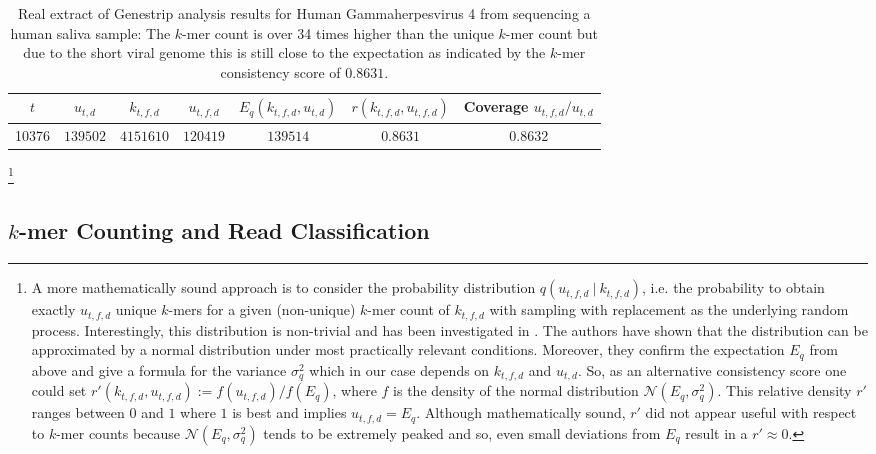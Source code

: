 \documentclass[letterpaper,11pt,leqno]{article}
\begin{document}
\begin{table}[h]
\centering
\begin{tabular}{c|c|c|c|c|c|c}
$t$ & $u_{t,d}$ & $k_{t,f,d}$ & $u_{t,f,d}$ & $E_q(k_{t,f,d},u_{t,d})$ & $r(k_{t,f,d}, u_{t,f,d})$ & Coverage $u_{t,f,d} / u_{t,d}$  \\
  \hline
  10376 & $139502$ & $4151610$ & $120419$ & $139514$ & $0.8631$ & $0.8632$
\end{tabular}
\caption{Real extract of Genestrip analysis results for Human Gammaherpesvirus 4 from sequencing a human saliva sample: The $k$-mer count is over 34 times higher than the unique $k$-mer count but due to the short viral genome this is still close to the expectation as indicated by the $k$-mer consistency score of $0.8631$.}\label{ebv}
\end{table}

\footnote{A more mathematically sound approach is to consider the probability distribution 
$q(u_{t,f,d}\ |\ k_{t,f,d})$, i.e. the probability to obtain exactly $u_{t,f,d}$ unique $k$-mers for a given (non-unique) $k$-mer count of $k_{t,f,d}$ with  sampling with replacement as the underlying random process.
Interestingly, this distribution is non-trivial and has been investigated in \cite{Mendelson2016WhatIT}. The authors have shown that the distribution can be approximated by a normal distribution under most practically relevant conditions. Moreover, they confirm the expectation $E_q$ from above and give a formula for the variance $\sigma^2_q$ which in our case depends on $k_{t,f,d}$ and $u_{t,d}$. 
So, as an alternative consistency score one could set $r'(k_{t,f,d}, u_{t,f,d}) := f(u_{t,f,d}) / f(E_q)$,
where $f$ is the density of the normal distribution $\mathcal{N}(E_q,\sigma^2_q)$.
This relative density $r'$ ranges between $0$ and $1$ where $1$ is best and implies $u_{t,f,d} = E_q$.
Although mathematically sound, $r'$ did not appear useful with respect to $k$-mer counts because $\mathcal{N}(E_q,\sigma^2_q)$ tends to be extremely peaked and so, even small deviations from $E_q$ result in a $r' \approx 0$.}


\subsection{$k$-mer Counting and Read Classification}
\end{document}
